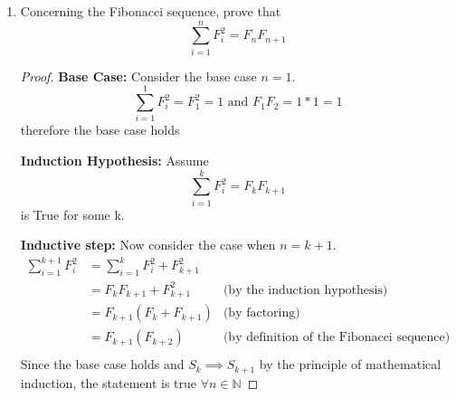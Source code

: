 \documentclass{article}
\newcommand{\N}{\mathbb{N}}
\newcommand{\ol}[1]{\overline{#1}}
\newcommand{\nitem}[1] %
{
	\setcounter{enumi}{#1}
	\addtocounter{enumi}{-1}
	\item
}
\begin{document}
\begin{enumerate}
\begin{proof}
			\textbf{Inductive step:} Now consider the case when $n=k+1$. 
			Let B denote $A_1 \cup A_2 \cup \hdots \cup A_{k}$. by the inductive hypothesis $\ol{B} =\ol{A_1} \cap \ol{A_2} \cap \hdots \cap \ol{A_k}$. 
			\begin{align*}
				\ol{B \cup A_{k+1}} &=\{x \in U|\sim(x \in B \cup A_{k+1})\} & \text{(by definition of complement)}\\
				&=\{x \in U|\sim(x \in B \vee x \in A_{k+1})\} & \text{(by definition of union)}\\
				&=\{x \in U|\sim(x \in B) \wedge \sim(x \in A_{k+1})\} & \text{(by DeMorgans law)}\\
				&=\{x \in U|x \in\ol{B} \wedge x \in \ol{A_{k+1}} \} & \text{(by definition of complement)}\\
				&=\{x \in U|x \in\ol{B} \cap \ol{A_{k+1}} \} & \text{(by definition of intersection)}\\
				&=\ol{B} \cap \ol{A_{k+1}}\\
				&= \ol{A_1} \cap \ol{A_2} \cap \hdots \cap \ol{A_{k+1}}\\
			\end{align*} 
			Since the base case holds and $S_k \implies S_{k+1}$ 
			by the principle of mathematical induction, the statement is true $\forall n, n \ge 2$
		\end{proof}
		
		\nitem{26}  Concerning the Fibonacci sequence, prove that 
		$$\sum_{i=1}^{n}F_i^2= F_n F_{n+1}$$
		\begin{proof}
			\textbf{Base Case:} 
			Consider the base case $n=1$.
			$$\sum_{i=1}^{1}F_i^2=F_1^2 = 1 \text{ and } F_{1}F_{2} = 1*1 =1 $$
			therefore the base case holds
			
			\textbf{Induction Hypothesis:} Assume $$\sum_{i=1}^{k}F_i^2= F_k F_{k+1}$$ is True for some k.
			
			\textbf{Inductive step:} Now consider the case when $n=k+1$.
			\begin{align*}
				\sum_{i=1}^{k+1}F_i^2 &= \sum_{i=1}^{k}F_i^2 + F_{k+1}^2\\
				&= F_k F_{k+1} + F_{k+1}^2 & \text{(by the induction hypothesis)}\\
				&= F_{k+1}(F_k  + F_{k+1}) & \text{(by factoring)}\\
				&= F_{k+1}(F_{k+2}) & \text{(by definition of the Fibonacci sequence)}\\
			\end{align*}
			Since the base case holds and $S_k \implies S_{k+1}$ 
			by the principle of mathematical induction, the statement is true $\forall n \in \N$
		\end{proof}
		

\end{enumerate}
\end{document}
